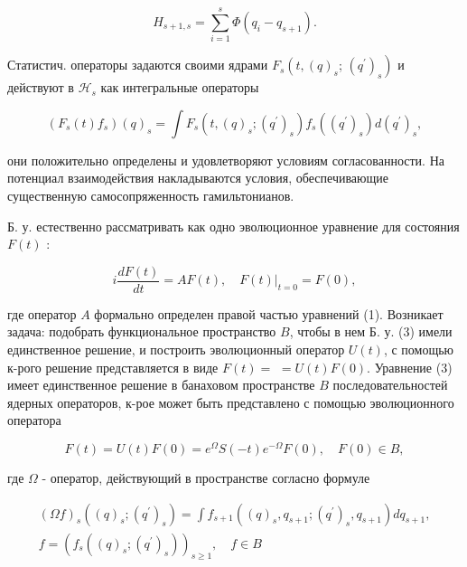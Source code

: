 \documentclass[10pt]{article}
\begin{document}
\[

H_{s+1, s}=\sum_{i=1}^{s} \Phi\left(q_{i}-q_{s+1}\right) .

\]



Статистич. операторы задаются своими ядрами $F_{s}\left(t,(q)_{s}\right.$; $\left.\left(q^{\prime}\right)_{s}\right)$ и действуют в $\mathscr{H}_{s}$ как интегральные операторы



\[

\left(F_{s}(t) f_{s}\right)(q)_{s}=\int F_{s}\left(t,(q)_{s} ;\left(q^{\prime}\right)_{s}\right) f_{s}\left(\left(q^{\prime}\right)_{s}\right) d\left(q^{\prime}\right)_{s},

\]



они положительно определены и удовлетворяют условиям согласованности. На потенциал взаимодействия накладываются условия, обеспечивающие существенную самосопряженность гамильтонианов.



Б. у. естественно рассматривать как одно эволюционное уравнение для состояния $F(t)$ :



\[

i \frac{d F(t)}{d t}=A F(t),\left.\quad F(t)\right|_{t=0}=F(0),

\]



где оператор $A$ формально определен правой частью уравнений (1). Возникает задача: подобрать функциональное пространство $B$, чтобы в нем Б. у. (3) имели единственное решение, и построить эволюционный оператор $U(t)$, с помощью к-рого решение представляется в виде $F(t)=$ $=U(t) F(0)$. Уравнение (3) имеет единственное решение в банаховом пространстве $B$ последовательностей ядерных операторов, к-рое может быть представлено с помощью эволюционного оператора



\[

F(t)=U(t) F(0)=e^{\Omega} S(-t) e^{-\Omega} F(0), \quad F(0) \in B,

\]



где $\Omega$ - оператор, действующий в пространстве согласно формуле



\[

\begin{gathered}

(\Omega f)_{s}\left((q)_{s} ;\left(q^{\prime}\right)_{s}\right)=\int f_{s+1}\left((q)_{s}, q_{s+1} ;\left(q^{\prime}\right)_{s}, q_{s+1}\right) d q_{s+1}, \\

f=\left(f_{s}\left((q)_{s} ;\left(q^{\prime}\right)_{s}\right)\right)_{s \geqslant 1}, \quad f \in B

\end{gathered}

\]
\end{document}
